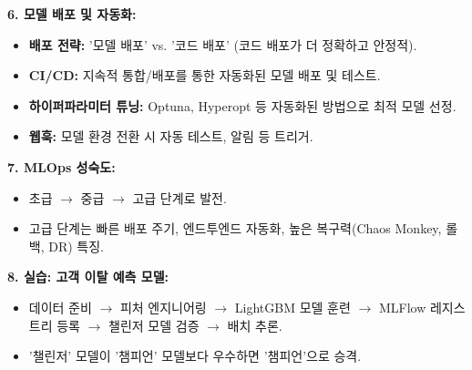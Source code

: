 \documentclass[11pt,a4paper]{article}
\theoremstyle{definition}
\begin{document}
\begin{tcolorbox}[colback=lightblue, colframe=darkblue, title=\textbf{CSCI103 Lecture 9 핵심 요약}]
\textbf{6. 모델 배포 및 자동화:}
\begin{itemize}
    \item \textbf{배포 전략:} '모델 배포' vs. '코드 배포' (코드 배포가 더 정확하고 안정적).
    \item \textbf{CI/CD:} 지속적 통합/배포를 통한 자동화된 모델 배포 및 테스트.
    \item \textbf{하이퍼파라미터 튜닝:} Optuna, Hyperopt 등 자동화된 방법으로 최적 모델 선정.
    \item \textbf{웹훅:} 모델 환경 전환 시 자동 테스트, 알림 등 트리거.
\end{itemize}

\textbf{7. MLOps 성숙도:}
\begin{itemize}
    \item 초급 $\rightarrow$ 중급 $\rightarrow$ 고급 단계로 발전.
    \item 고급 단계는 빠른 배포 주기, 엔드투엔드 자동화, 높은 복구력(Chaos Monkey, 롤백, DR) 특징.
\end{itemize}

\textbf{8. 실습: 고객 이탈 예측 모델:}
\begin{itemize}
    \item 데이터 준비 $\rightarrow$ 피처 엔지니어링 $\rightarrow$ LightGBM 모델 훈련 $\rightarrow$ MLFlow 레지스트리 등록 $\rightarrow$ 챌린저 모델 검증 $\rightarrow$ 배치 추론.
    \item '챌린저' 모델이 '챔피언' 모델보다 우수하면 '챔피언'으로 승격.
\end{itemize}

\end{tcolorbox}
\end{document}
